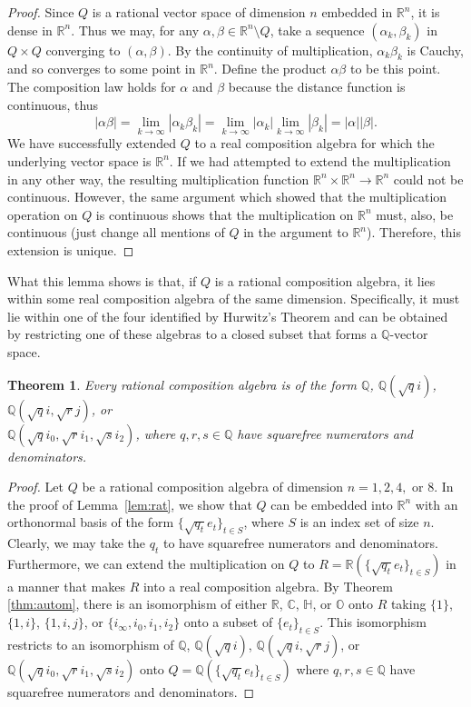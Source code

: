 \documentclass[10pt]{amsart}
\newcommand{\Q}{\mathbb{Q}}
\newcommand{\R}{\mathbb{R}}
\newcommand{\C}{\mathbb{C}}
\renewcommand{\H}{\mathbb{H}}
\renewcommand{\O}{\mathbb{O}}
\newtheorem{thm}{Theorem}
\begin{document}
\begin{proof}
Since $Q$ is a rational vector space of dimension $n$ embedded in $\R^n$, it is dense in $\R^n$.  Thus we may, for any $\alpha,\beta \in \R^n \setminus Q$, take a sequence $(\alpha_k, \beta_k)$ in $Q \times Q$ converging to $(\alpha, \beta)$.  By the continuity of multiplication, $\alpha_k \beta_k$ is Cauchy, and so converges to some point in $\R^n$.  Define the product $\alpha\beta$ to be this point.  The composition law holds for $\alpha$ and $\beta$ because the distance function is continuous, thus
$$
|\alpha\beta| = \lim_{k \rightarrow \infty} |\alpha_k \beta_k| = \lim_{k \rightarrow \infty} |\alpha_k| \lim_{k \rightarrow \infty} |\beta_k| = |\alpha||\beta|.
$$
We have successfully extended $Q$ to a real composition algebra for which the underlying vector space is $\R^n$.  If we had attempted to extend the multiplication in any other way, the resulting multiplication function $\R^n \times \R^n \rightarrow \R^n$ could not be continuous.  However, the same argument which showed that the multiplication operation on $Q$ is continuous shows that the multiplication on $\R^n$ must, also, be continuous (just change all mentions of $Q$ in the argument to $\R^n$).  Therefore, this extension is unique.
\end{proof}

What this lemma shows is that, if $Q$ is a rational composition algebra, it lies within some real composition algebra of the same dimension.  Specifically, it must lie within one of the four identified by Hurwitz's Theorem and can be obtained by restricting one of these algebras to a closed subset that forms a $\Q$-vector space.

\begin{thm}
\normalfont
Every rational composition algebra is of the form
$\Q$, $\Q(\sqrt{q} i)$, $\Q(\sqrt{q} i, \sqrt{r} j)$, or \\$\Q(\sqrt{q} i_0, \sqrt{r} i_1, \sqrt{s}i_2)$, where $q,r,s \in \Q$ have squarefree numerators and denominators.
\end{thm}

\begin{proof}
Let $Q$ be a rational composition algebra of dimension $n = 1, 2, 4,$ or $8$.  In the proof of Lemma~\ref{lem:rat}, we show that $Q$ can be embedded into $\R^n$ with an orthonormal basis of the form $\{\sqrt{q_t}e_t\}_{t \in S}$, where $S$ is an index set of size $n$.  Clearly, we may take the $q_t$ to have squarefree numerators and denominators.  Furthermore, we can extend the multiplication on $Q$ to $R = \R(\{\sqrt{q_t}e_t\}_{t \in S})$ in a manner that makes $R$ into a real composition algebra.  By Theorem \ref{thm:autom}, there is an isomorphism of either $\R$, $\C$, $\H$, or $\O$ onto $R$ taking $\{1\}$, $\{1, i\}$, $\{1, i, j\}$, or $\{i_\infty, i_0, i_1, i_2\}$ onto a subset of $\{e_t\}_{t \in S}$.  This isomorphism restricts to an isomorphism of $\Q$, $\Q(\sqrt{q} i)$, $\Q(\sqrt{q} i, \sqrt{r} j)$, or $\Q(\sqrt{q} i_0, \sqrt{r} i_1, \sqrt{s}i_2)$ onto $Q = \Q(\{\sqrt{q_t}e_t\}_{t \in S})$ where $q,r,s \in \Q$ have squarefree numerators and denominators.
\end{proof}
\end{document}
